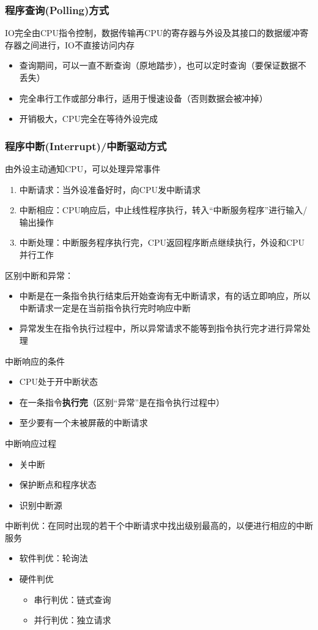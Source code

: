 \subsubsection{程序查询(Polling)方式}
IO完全由CPU指令控制，数据传输再CPU的寄存器与外设及其接口的数据缓冲寄存器之间进行，IO不直接访问内存
\begin{itemize}
	\item 查询期间，可以一直不断查询（原地踏步），也可以定时查询（要保证数据不丢失）
	\item 完全串行工作或部分串行，适用于慢速设备（否则数据会被冲掉）
	\item 开销极大，CPU完全在等待外设完成
\end{itemize}

\subsubsection{程序中断(Interrupt)/中断驱动方式}
由外设主动通知CPU，可以处理异常事件
\begin{enumerate}
	\item 中断请求：当外设准备好时，向CPU发中断请求
	\item 中断相应：CPU响应后，中止线性程序执行，转入“中断服务程序”进行输入/输出操作
	\item 中断处理：中断服务程序执行完，CPU返回程序断点继续执行，外设和CPU并行工作
\end{enumerate}
区别中断和异常：
\begin{itemize}
	\item 中断是在一条指令执行结束后开始查询有无中断请求，有的话立即响应，所以中断请求一定是在当前指令执行完时响应中断
	\item 异常发生在指令执行过程中，所以异常请求不能等到指令执行完才进行异常处理
\end{itemize}
中断响应的条件
\begin{itemize}
	\item CPU处于开中断状态
	\item 在一条指令\textbf{执行完}（区别“异常”是在指令执行过程中）
	\item 至少要有一个未被屏蔽的中断请求
\end{itemize}
中断响应过程
\begin{itemize}
	\item 关中断
	\item 保护断点和程序状态
	\item 识别中断源
\end{itemize}
中断判优：在同时出现的若干个中断请求中找出级别最高的，以便进行相应的中断服务
\begin{itemize}
	\item 软件判优：轮询法
	\item 硬件判优
	\begin{itemize}
		\item 串行判优：链式查询
		\item 并行判优：独立请求
	\end{itemize}
\end{itemize}
